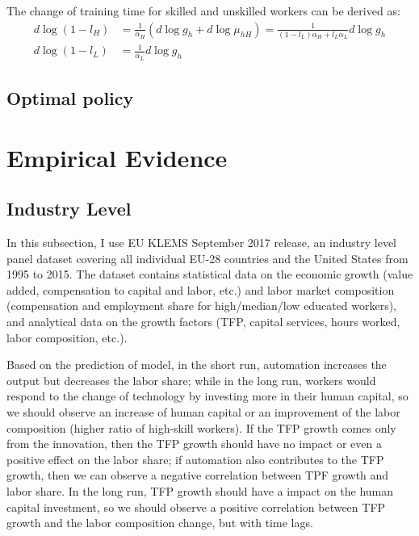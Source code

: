 \documentclass[12pt]{article}
\begin{document}
 
The change of training time for skilled and unskilled workers can be derived as: 
\begin{align*}
d\log(1-l_H) &= \frac{1}{\alpha_H}(d\log g_h+d\log\mu_{hH})= \frac{1}{(1-l_L)\alpha_H+l_L\alpha_L}d\log g_h \\
d\log(1-l_L) &= \frac{1}{\alpha_L}d\log g_h
\end{align*}


\subsection{Optimal policy}

\section{Empirical Evidence}
\subsection{Industry Level}
In this subsection, I use EU KLEMS September 2017 release, an industry level panel dataset covering all individual EU-28 countries and the United States from 1995 to 2015. The dataset contains statistical data on the economic growth (value added, compensation to capital and labor, etc.) and labor market composition (compensation and employment share for high/median/low educated workers), and analytical data on the growth factors (TFP, capital services, hours worked, labor composition, etc.). 

Based on the prediction of model, in the short run, automation increases the output but decreases the labor share; while in the long run, workers would respond to the change of technology by investing more in their human capital, so we should observe an increase of human capital or an improvement of the labor composition (higher ratio of high-skill workers). If the TFP growth comes only from the innovation, then the TFP growth should have no impact or even a positive effect on the labor share; if automation also contributes to the TFP growth, then we can observe a negative correlation between TPF growth and labor share. In the long run, TFP growth should have a impact on the human capital investment, so we should observe a positive correlation between TFP growth and the labor composition change, but with time lags.
\end{document}

